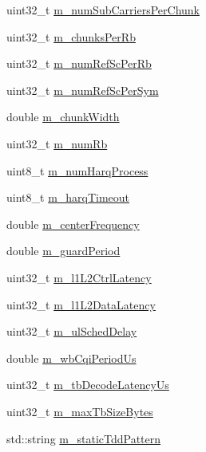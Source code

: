 \begin{DoxyCompactItemize}
uint32\+\_\+t \hyperlink{classns3_1_1MmWavePhyMacCommon_a826b986235b169920ac1a6b26ee7f59e}{m\+\_\+num\+Sub\+Carriers\+Per\+Chunk}
\item 
uint32\+\_\+t \hyperlink{classns3_1_1MmWavePhyMacCommon_ae715e8c8b35d4844a8d608e65753451f}{m\+\_\+chunks\+Per\+Rb}
\item 
uint32\+\_\+t \hyperlink{classns3_1_1MmWavePhyMacCommon_a775e4cddce3be8fd0c7dce8a7021fcb1}{m\+\_\+num\+Ref\+Sc\+Per\+Rb}
\item 
uint32\+\_\+t \hyperlink{classns3_1_1MmWavePhyMacCommon_a160d8ee57d399bdc44f388f806784522}{m\+\_\+num\+Ref\+Sc\+Per\+Sym}
\item 
double \hyperlink{classns3_1_1MmWavePhyMacCommon_a6eca13a16915823b63cf56fe11c48d31}{m\+\_\+chunk\+Width}
\item 
uint32\+\_\+t \hyperlink{classns3_1_1MmWavePhyMacCommon_ae362333894bab75327f13bccd391a83c}{m\+\_\+num\+Rb}
\item 
uint8\+\_\+t \hyperlink{classns3_1_1MmWavePhyMacCommon_a3db39d6fac0cc4b1a922a06fc0461d0e}{m\+\_\+num\+Harq\+Process}
\item 
uint8\+\_\+t \hyperlink{classns3_1_1MmWavePhyMacCommon_aefa63501ca7b8e7086beac5fdd05974f}{m\+\_\+harq\+Timeout}
\item 
double \hyperlink{classns3_1_1MmWavePhyMacCommon_a02d8d937a757a4acee4beb7a34aa1461}{m\+\_\+center\+Frequency}
\item 
double \hyperlink{classns3_1_1MmWavePhyMacCommon_a0b542dc41bcdbf84e746d2956e36eff1}{m\+\_\+guard\+Period}
\item 
uint32\+\_\+t \hyperlink{classns3_1_1MmWavePhyMacCommon_aa7dbdd4430a5edce0df34d8bf6b21f2a}{m\+\_\+l1\+L2\+Ctrl\+Latency}
\item 
uint32\+\_\+t \hyperlink{classns3_1_1MmWavePhyMacCommon_a6438ee2ea366a4d782af8620eef558e7}{m\+\_\+l1\+L2\+Data\+Latency}
\item 
uint32\+\_\+t \hyperlink{classns3_1_1MmWavePhyMacCommon_ae81ae7fdf0624e2384178c40c5362f39}{m\+\_\+ul\+Sched\+Delay}
\item 
double \hyperlink{classns3_1_1MmWavePhyMacCommon_a51c7d963b55442020bb4d54074fca3eb}{m\+\_\+wb\+Cqi\+Period\+Us}
\item 
uint32\+\_\+t \hyperlink{classns3_1_1MmWavePhyMacCommon_ab6cf13ebe59c6b88f6c2bb58ea6535a8}{m\+\_\+tb\+Decode\+Latency\+Us}
\item 
uint32\+\_\+t \hyperlink{classns3_1_1MmWavePhyMacCommon_a62c9cd47b0e8ab76dc01370b388f06af}{m\+\_\+max\+Tb\+Size\+Bytes}
\item 
std\+::string \hyperlink{classns3_1_1MmWavePhyMacCommon_a535f573b6fadcaa0db66d543d4eaf6c3}{m\+\_\+static\+Tdd\+Pattern}
\end{DoxyCompactItemize}
